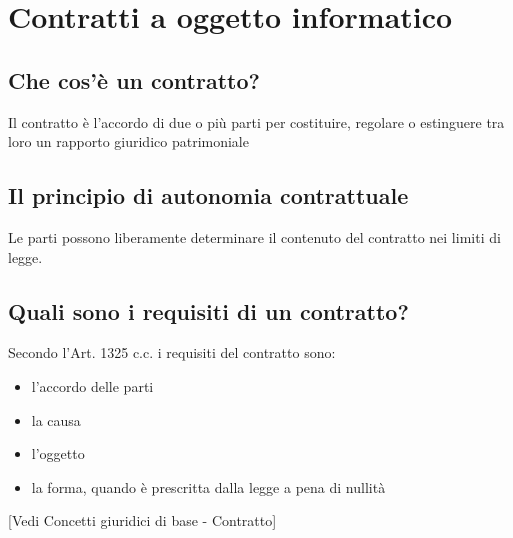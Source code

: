 \newpage
\section{Contratti a oggetto informatico}
\subsection{Che cos'è un contratto?}
Il contratto è l'accordo di due o più parti per costituire, regolare o estinguere
tra loro un rapporto giuridico patrimoniale
\subsection{Il principio di autonomia contrattuale}
Le parti possono liberamente determinare il contenuto del contratto nei limiti di legge.
\subsection{Quali sono i requisiti di un contratto?}
Secondo l'Art. 1325 c.c. i requisiti del contratto sono:
\begin{itemize}
    \item l'accordo delle parti
    \item la causa
    \item l'oggetto
    \item la forma, quando è prescritta dalla legge a pena di nullità
\end{itemize}
[Vedi {Concetti giuridici di base - Contratto}]

